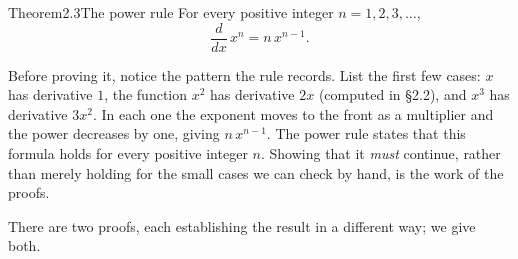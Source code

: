 \documentclass[a4paper,12pt,oneside]{memoir}
\begin{document}
\begin{envtheorem}{Theorem}{2.3}{The power rule}
For every positive integer \(n = 1, 2, 3, \ldots\), \[ \frac{d}{dx}\,x^{n} = n\,x^{n-1}. \]
\end{envtheorem}
Before proving it, notice the pattern the rule records. List the first few cases: \(x\) has derivative \(1\), the function \(x^{2}\) has derivative \(2x\) (computed in §2.2), and \(x^{3}\) has derivative \(3x^{2}\). In each one the exponent moves to the front as a multiplier and the power decreases by one, giving \(n\,x^{n-1}\). The power rule states that this formula holds for every positive integer \(n\). Showing that it \emph{must} continue, rather than merely holding for the small cases we can check by hand, is the work of the proofs.

There are two proofs, each establishing the result in a different way; we give both.
\end{document}
